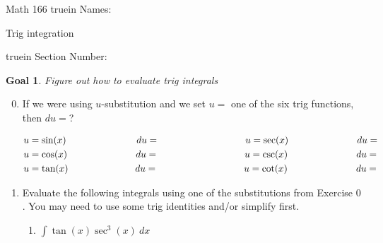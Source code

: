 \documentclass[12pt]{article}
\newtheorem*{goal}{Goal}
\begin{document}
\pagestyle{empty} %

\noindent
{Math 166   truein  Names:\ \hrulefill}

\noindent
{Trig integration}

\noindent  {} truein  Section Number:\ \hrulefill
\smallskip

\begin{goal} \rm
Figure out how to evaluate trig integrals 
\end{goal}


\begin{enumerate}
\setcounter{enumi}{-1}


\item If we were using $u$-substitution and we set $u=$ one of the six trig functions, then $du=$? 

\noindent
\begin{align*}
u &= \sin (x) \hspace{1.025in} du = \hspace{1.25in} u = \sec (x) \hspace{1in} du = \\
u &= \cos (x)\hspace{1in} du = \hspace{1.25in} u = \csc (x) \hspace{1in} du = \\
u &= \tan (x)\hspace{.975in} du = \hspace{1.25in}
u = \cot(x) \hspace{1in} du = 
\end{align*}

\item Evaluate the following integrals using one of the substitutions from Exercise $0$. You may need to use some trig identities and/or simplify first.
\begin{enumerate}
\item $\displaystyle\int  \tan (x) \sec^3 (x) \ dx$


\end{enumerate}
\end{enumerate}
\end{document}
